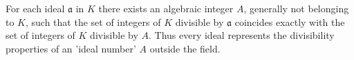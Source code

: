 For each ideal $\mathfrak{a}$ in $K$ there exists an algebraic integer $A$, generally not belonging to $K$, such that the set of integers of $K$ divisible by $\mathfrak{a}$ coincides exactly with the set of integers of $K$ divisible by $A$. Thus every ideal represents the divisibility properties of an 'ideal number' $A$ outside the field.
